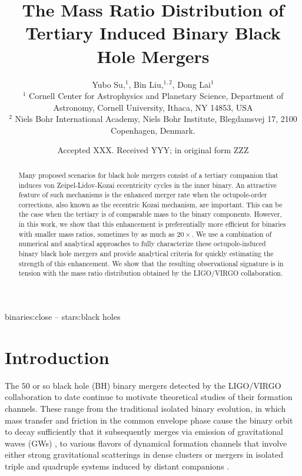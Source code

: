 \documentclass[
        fleqn,
        usenatbib,
    ]{mnras}
\title[Mass Ratio Distribution]{The Mass Ratio Distribution of
Tertiary Induced Binary Black Hole Mergers}
\author[Y. Su et\ al.]{
Yubo Su,$^1$,
Bin Liu,$^{1,2}$,
Dong Lai$^1$
\\
$^1$ Cornell Center for Astrophysics and Planetary Science, Department of
Astronomy, Cornell University, Ithaca, NY 14853, USA\\
$^2$ Niels Bohr International Academy, Niels Bohr Institute, Blegdamsvej 17,
2100 Copenhagen, Denmark.
}
\date{Accepted XXX\@. Received YYY\@; in original form ZZZ}
\begin{document}
\label{firstpage}
\pagerange{\pageref{firstpage}--\pageref{lastpage}}
\maketitle

\begin{abstract}
    Many proposed scenarios for black hole mergers consist of a tertiary
    companion that induces von Zeipel-Lidov-Kozai eccentricity cycles in the
    inner binary. An attractive feature of such mechanisms is the enhanced
    merger rate when the octupole-order corrections, also known as the eccentric
    Kozai mechanism, are important. This can be the case when the tertiary is of
    comparable mass to the binary components. However, in this work, we show
    that this enhancement is preferentially more efficient for binaries with
    smaller mass ratios, sometimes by as much as $20\times$. We use a
    combination of numerical and analytical approaches to fully
    characterize these octupole-induced binary black hole mergers and provide
    analytical criteria for quickly estimating the strength of this enhancement.
    We show that the resulting observational signature is in tension with the
    mass ratio distribution obtained by the LIGO/VIRGO collaboration.
\end{abstract}

\begin{keywords}
binaries:close -- stars:black holes %
\end{keywords}

\section{Introduction}\label{s:intro}

The $50$ or so black hole (BH) binary mergers detected by the LIGO/VIRGO
collaboration to date \citep{LIGOO3a} continue to motivate theoretical studies of their
formation channels. These range from the traditional isolated binary evolution,
in which mass transfer and friction in the common envelope phase cause the
binary orbit to decay sufficiently that it subsequently merges via emission of
gravitational waves (GWs) \citep[e.g.,][]{lipunov1997black,
lipunov2017first, podsiadlowski2003formation, belczynski2010effect,
belczynski2016first, dominik2012double, dominik2013double, dominik2015double},
to various flavors of dynamical formation channels that involve either strong
gravitational scatterings in dense clusters \citep[e.g.,][]{zwart1999black,
o2006binary, miller2009mergers, banerjee2010stellar, downing2010compact,
ziosi2014dynamics, rodriguez2015binary, samsing2017assembly, samsing2018black,
rodriguez2018post, gondan2018eccentric} or mergers in isolated triple and
quadruple systems induced by distant companions \citep[e.g.,][]{miller2002four,
wen2003eccentricity, antonini2012secular, antonini2017binary, silsbee2017lidov,
bin1, LL18, randall2018induced, hoang2018black, fragione2019, fragione2019loeb,
LL19, bin_misc5, bin_misc1, bin_misc2}.
\end{document}
